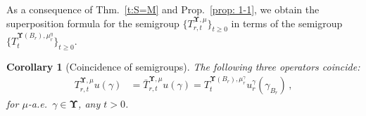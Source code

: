 \documentclass[11pt,letterpaper]{amsart}
\newcommand{\sem}[1]{\{#1\}_{t \ge 0}}
\newcommand{\QP}{{\mu}}
\newcommand{\dUpsilon}{{\mathbf \Upsilon}}
\newcommand{\U}{\dUpsilon}
\newcommand{\E}{\mathcal E}
\renewcommand{\1}{\mathbf 1}
\numberwithin{equation}{section}
\theoremstyle{plain}
\newtheorem{cor}[thm]{Corollary}%
\theoremstyle{definition}
\theoremstyle{remark}
\begin{document}
As a consequence of Thm.~\ref{t:S=M} and Prop.~\ref{prop: 1-1}, we obtain the superposition formula for  the semigroup $\sem{T_{r, t}^{\U, \QP}}$ in terms of the semigroup $\sem{T_t^{\U(B_r), \QP_r^\eta}}$. %
\begin{cor}[Coincidence of semigroups]\label{prop: 1}
The following three operators coincide: 
	\begin{align} \label{eq: R-1}
		T_{r, t}^{\U, \QP}u(\gamma) & = \bar{T}_{r, t}^{\U, \QP}u(\gamma) =T^{\U(B_r), \QP_r^\gamma}_{t} u_{r}^\gamma(\gamma_{B_r}) \, ,
	\end{align}
	for $\QP$-a.e.\ $\gamma\in \dUpsilon$, any $t>0$.
\end{cor}


\end{document}
